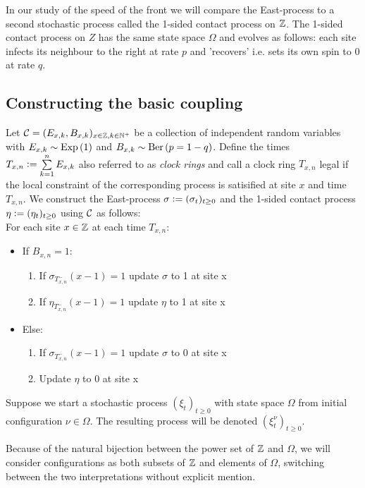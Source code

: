 In our study of the speed of the front we will compare the East-process to a second stochastic process called the 1-sided contact process on $\Z$. The 1-sided contact process on $Z$ has the same state space $\Omega$ and evolves as follows: each site infects its neighbour to the right at rate $p$ and 'recovers' i.e. sets its own spin to 0 at rate $q$. 

\subsection{Constructing the basic coupling}
Let $\cal{C}=(E_{x,k}, B_{x,k})_{x \in \Z, k \in \N^+}$ be a collection of independent random variables with $E_{x,k} \sim \dExp{1}$ and $B_{x,k} \sim \dBer{p=1-q}$. Define the times $T_{x,n} \defeq \sum\limits_{k=1}^n E_{x,k}$ also referred to as \textit{clock rings} and call a clock ring $T_{x,n}$ legal if the local constraint of the corresponding process is satisified at site $x$ and time $T_{x,n}$. We construct the East-process $\sigma \defeq (\sigma_t)_{t \geq 0}$ and the 1-sided contact process $\eta \defeq (\eta_t)_{t \geq 0}$ using $\cal{C}$ as follows: \\

For each site $x \in \Z$ at each time $T_{x,n}$:
\begin{itemize}
  \item If $B_{x,n} = 1$:
  \begin{enumerate}
  	\item If $\sigma_{T^-_{x,n}} (x-1) = 1$ update $\sigma$ to 1 at site x
  	\item If $\eta_{T^-_{x,n}} (x-1) = 1$ update $\eta$ to 1 at site x
  \end{enumerate}
  \item Else:
  \begin{enumerate}
  	\item If $\sigma_{T^-_{x,n}} (x-1) = 1$ update $\sigma$ to 0 at site x
  	\item Update $\eta$ to 0 at site x
  \end{enumerate}
\end{itemize}

\begin{notation}
Suppose we start a stochastic process $(\xi_t)_{t \geq 0}$ with state space $\Omega$ from initial configuration $\nu \in \Omega$. The resulting process will be denoted $(\xi^\nu_t)_{t \geq 0}$. 
\end{notation}
\begin{notation}
Because of the natural bijection between the power set of $\Z$ and $\Omega$, we will consider configurations as both subsets of $\Z$ and elements of $\Omega$, switching between the two interpretations without explicit mention. 
\end{notation}

